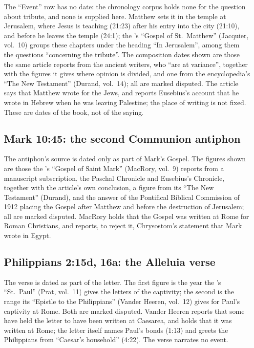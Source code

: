 The ``Event'' row has no date: the chronology corpus holds none for the
question about tribute, and none is supplied here. Matthew sets it in the
temple at Jerusalem, where Jesus is teaching (21:23) after his entry into the
city (21:10), and before he leaves the temple (24:1); the 's ``Gospel of St.~Matthew'' (Jacquier, vol.~10) groups these
chapters under the heading ``In Jerusalem'', among them the questions
``concerning the tribute''. The composition dates shown are those the same
article reports from the ancient writers, who ``are at variance'', together
with the figures it gives where opinion is divided, and one from the
encyclopedia's ``The New Testament'' (Durand, vol.~14); all are marked
disputed. The article says that Matthew wrote for the Jews, and reports
Eusebius's account that he wrote in Hebrew when he was leaving Palestine; the
place of writing is not fixed. These are dates of the book, not of the saying.

\subsection{Mark 10:45: the second Communion antiphon}
\label{sec:date-mark}

The antiphon's source is dated only as part of Mark's Gospel. The figures
shown are those the 's ``Gospel of Saint Mark''
(MacRory, vol.~9) reports from a manuscript subscription, the Paschal
Chronicle and Eusebius's Chronicle, together with the article's own conclusion,
a figure from its ``The New Testament'' (Durand), and the answer of the
Pontifical Biblical Commission of 1912 placing the Gospel after Matthew and
before the destruction of Jerusalem; all are marked disputed. MacRory holds that
the Gospel was written at Rome for Roman Christians, and reports, to reject it,
Chrysostom's statement that Mark wrote in Egypt.

\subsection{Philippians 2:15d, 16a: the Alleluia verse}
\label{sec:date-philippians}

The verse is dated as part of the letter. The first figure is the year the
's ``St.~Paul'' (Prat, vol.~11) gives the letters
of the captivity; the second is the range its ``Epistle to the Philippians''
(Vander Heeren, vol.~12) gives for Paul's captivity at Rome. Both are marked
disputed. Vander Heeren reports that some have held the letter to have been
written at Caesarea, and holds that it was written at Rome; the letter itself
names Paul's bonds (1:13) and greets the Philippians from ``Caesar's household''
(4:22). The verse narrates no event.

